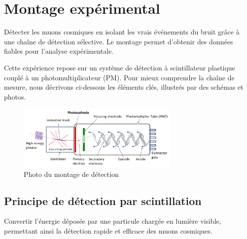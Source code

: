 \documentclass[a4paper,12pt,twoside]{article}
\begin{document}
\newpage

\section{Montage expérimental}


\vspace{1em}
\begin{center}
\begin{tcolorbox}[colback=blue!5!white, colframe=blue!60!black, title=Principe du montage expérimental]
Détecter les muons cosmiques en isolant les vrais événements du bruit grâce à une chaîne de détection sélective. Le montage permet d’obtenir des données fiables pour l’analyse expérimentale.
\end{tcolorbox}
\end{center}


Cette expérience repose sur un système de détection à scintillateur plastique couplé à un photomultiplicateur (PM). Pour mieux comprendre la chaîne de mesure, nous décrivons ci-dessous les éléments clés, illustrés par des schémas et photos.

\begin{figure}[H]
  \centering
  \includegraphics[width=0.7\textwidth]{Images/PhotoMultiplierTubeAndScintillator.png}
  \caption{Photo du montage de détection}
  \label{fig:setup}
\end{figure}

\subsection{Principe de détection par scintillation}


\vspace{1em}
\begin{center}
\begin{tcolorbox}[colback=blue!5!white, colframe=blue!60!black, title=Principe du scintillateur plastique]
Convertir l’énergie déposée par une particule chargée en lumière visible, permettant ainsi la détection rapide et efficace des muons cosmiques.
\end{tcolorbox}
\end{center}
\end{document}
